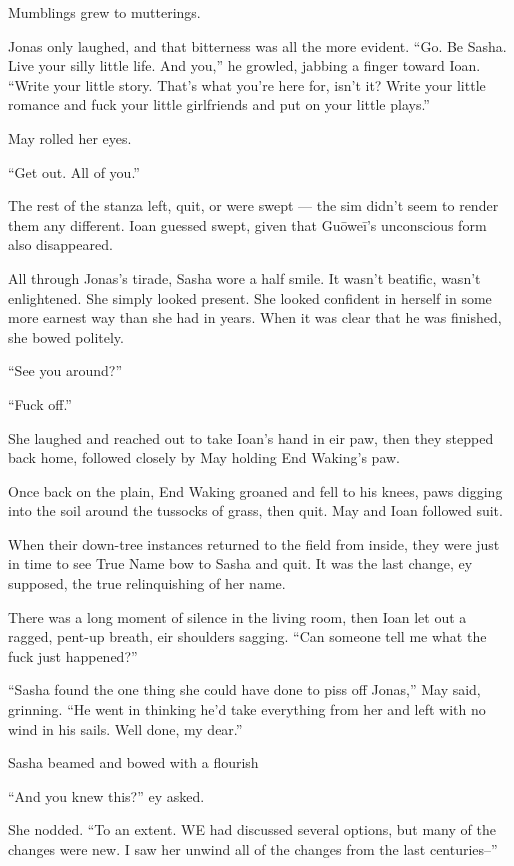 Mumblings grew to mutterings.

Jonas only laughed, and that bitterness was all the more evident. ``Go. Be Sasha. Live your silly little life. And you,'' he growled, jabbing a finger toward Ioan. ``Write your little story. That's what you're here for, isn't it? Write your little romance and fuck your little girlfriends and put on your little plays.''

May rolled her eyes.

``Get out. All of you.''

The rest of the stanza left, quit, or were swept — the sim didn't seem to render them any different. Ioan guessed swept, given that Guōweī's unconscious form also disappeared.

All through Jonas's tirade, Sasha wore a half smile. It wasn't beatific, wasn't enlightened. She simply looked present. She looked confident in herself in some more earnest way than she had in years. When it was clear that he was finished, she bowed politely.

``See you around?''

``Fuck off.''

She laughed and reached out to take Ioan's hand in eir paw, then they stepped back home, followed closely by May holding End Waking's paw.

Once back on the plain, End Waking groaned and fell to his knees, paws digging into the soil around the tussocks of grass, then quit. May and Ioan followed suit.

When their down-tree instances returned to the field from inside, they were just in time to see True Name bow to Sasha and quit. It was the last change, ey supposed, the true relinquishing of her name.

There was a long moment of silence in the living room, then Ioan let out a ragged, pent-up breath, eir shoulders sagging. ``Can someone tell me what the fuck just happened?''

``Sasha found the one thing she could have done to piss off Jonas,'' May said, grinning. ``He went in thinking he'd take everything from her and left with no wind in his sails. Well done, my dear.''

Sasha beamed and bowed with a flourish

``And you knew this?'' ey asked.

She nodded. ``To an extent. WE had discussed several options, but many of the changes were new. I saw her unwind all of the changes from the last centuries--''

